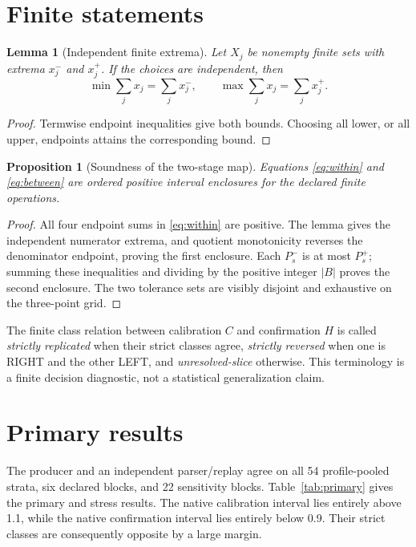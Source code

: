\documentclass[10pt,a4paper]{article}
\newtheorem{lemma}{Lemma}
\newtheorem{proposition}{Proposition}
\begin{document}
\section{Finite statements}

\begin{lemma}[Independent finite extrema]
Let $X_j$ be nonempty finite sets with extrema $x_j^-$ and $x_j^+$.  If the
choices are independent, then
\[
 \min\sum_jx_j=\sum_jx_j^-,\qquad
 \max\sum_jx_j=\sum_jx_j^+.
\]
\end{lemma}
\begin{proof}
Termwise endpoint inequalities give both bounds.  Choosing all lower, or all
upper, endpoints attains the corresponding bound.
\end{proof}

\begin{proposition}[Soundness of the two-stage map]
Equations \eqref{eq:within} and \eqref{eq:between} are ordered positive
interval enclosures for the declared finite operations.
\end{proposition}
\begin{proof}
All four endpoint sums in \eqref{eq:within} are positive.  The lemma gives
the independent numerator extrema, and quotient monotonicity reverses the
denominator endpoint, proving the first enclosure.  Each $P_s^-$ is at most
$P_s^+$; summing these inequalities and dividing by the positive integer
$|B|$ proves the second enclosure.  The two tolerance sets are visibly
disjoint and exhaustive on the three-point grid.
\end{proof}

The finite class relation between calibration $C$ and confirmation $H$ is
called \emph{strictly replicated} when their strict classes agree, \emph{strictly
reversed} when one is RIGHT and the other LEFT, and \emph{unresolved-slice}
otherwise.  This terminology is a finite decision diagnostic, not a
statistical generalization claim.

\section{Primary results}

The producer and an independent parser/replay agree on all 54 profile-pooled
strata, six declared blocks, and 22 sensitivity blocks.  Table~\ref{tab:primary}
gives the primary and stress results.  The native calibration interval lies
entirely above 1.1, while the native confirmation interval lies entirely below
0.9.  Their strict classes are consequently opposite by a large margin.
\end{document}

